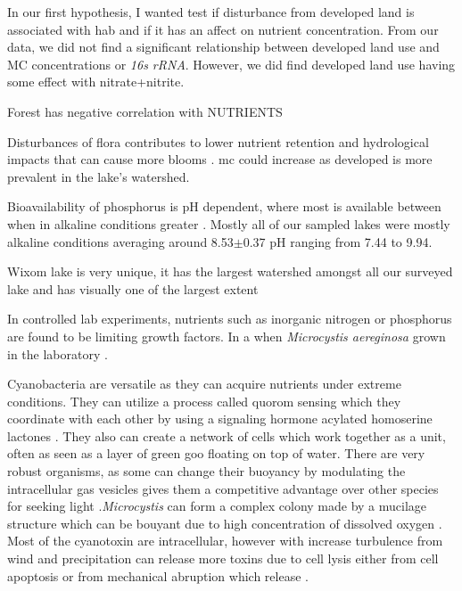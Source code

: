 In our first hypothesis, I wanted test if disturbance from developed land is associated with \gls{hab} and if it has an affect on nutrient concentration.  From our data, we did not find a significant relationship between developed land use and MC concentrations or \emph{16s rRNA}. However, we did find developed land use having some effect with nitrate+nitrite.

Forest has negative correlation with NUTRIENTS

Disturbances of flora contributes to lower nutrient retention and hydrological impacts that can cause more blooms \cite{anderson_harmful_2002, codd_cyanobacterial_2000, fraterrigo_influence_2008}.
\gls{mc} could increase as developed is more prevalent in the lake's watershed.


Bioavailability of phosphorus is pH dependent, where most is available between when in alkaline conditions greater \cite{lucas_relationships_1961}.
Mostly all of our sampled lakes were mostly alkaline conditions averaging around 8.53$\pm$0.37 pH ranging from 7.44 to 9.94.

Wixom lake is very unique, it has the largest watershed amongst all our surveyed lake and has visually one of the largest extent



In controlled lab experiments, nutrients such as inorganic nitrogen or phosphorus are found to be limiting growth factors. In a  when \emph{Microcystis aereginosa} grown in the laboratory \cite{xiao_colony_2018, yema_role_2016}.

Cyanobacteria are versatile as they can acquire nutrients under extreme conditions. They can utilize a process called quorom sensing which they coordinate with each other by using a signaling hormone acylated homoserine lactones \cite{van_mooy_quorum_2012}. They also can create a network of cells which work together as a unit, often as seen as a layer of green goo floating on top of water.  There are very robust organisms, as some can change their buoyancy by modulating the intracellular gas vesicles gives them a competitive advantage over other species for seeking light \cite{feng_how_2018}.\emph{Microcystis} can form a complex colony made by a mucilage structure which can be bouyant due to high concentration of dissolved oxygen \cite{xiao_colony_2018}. %
Most of the cyanotoxin are intracellular, however with increase turbulence from wind and precipitation can release more toxins due to cell lysis either from cell apoptosis or from mechanical abruption which release \cite{rohrlack_fate_2007}. %



